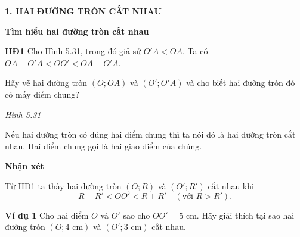 \begin{lesson}
    \textbf{1. HAI ĐƯỜNG TRÒN CẮT NHAU}

    \textbf{Tìm hiểu hai đường tròn cắt nhau}

    \textbf{HĐ1} Cho Hình 5.31, trong đó giả sử $O'A<OA$. Ta có $OA-O'A<OO'<OA+O'A$.

    Hãy vẽ hai đường tròn $(O;OA)$ và $(O';O'A)$ và cho biết hai đường tròn đó có mấy điểm chung?

    \begin{center}

        \textit{Hình 5.31}
    \end{center}

    \answerline
    \answerline

    \begin{keyconcept}
        Nếu hai đường tròn có đúng hai điểm chung thì ta nói đó là hai đường tròn cắt nhau. Hai điểm chung gọi là hai giao điểm của chúng.
    \end{keyconcept}

    \textbf{Nhận xét}

    Từ HĐ1 ta thấy hai đường tròn $(O;R)$ và $(O';R')$ cắt nhau khi
    \[
        R-R'<OO'<R+R'\quad (\text{với }R>R').
    \]

    \textbf{Ví dụ 1} Cho hai điểm $O$ và $O'$ sao cho $OO'=5$ cm. Hãy giải thích tại sao hai đường tròn $(O;4\text{ cm})$ và $(O';3\text{ cm})$ cắt nhau.

    \begin{center}


\end{center}
\end{lesson}
